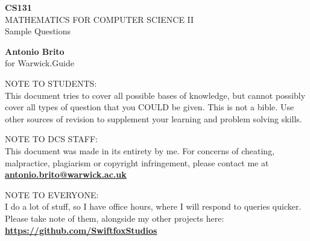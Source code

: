 \documentclass[12pt]{exam}
\begin{document}
\begin{titlepage}
   \begin{center}
       \vspace*{1cm}

       \Large \textbf{CS131}
       \\
        MATHEMATICS FOR COMPUTER SCIENCE II
        \\
        \small Sample Questions
            
       \vspace{1.5cm}

       \large \textbf{Antonio Brito}
       \\
       for Warwick.Guide

       \vfill
            
       NOTE TO STUDENTS:
       \\
       This document tries to cover all possible bases of knowledge, but cannot possibly cover all types of question that you COULD be given. This is not a bible. Use other sources of revision to supplement your learning and problem solving skills.
       
            
       \vspace{0.8cm}
       
       NOTE TO DCS STAFF:
       \\
       This document was made in its entirety by me. For concerns of cheating, malpractice, plagiarism or copyright infringement, please contact me at \href{mailto:antonio.brito@warwick.ac.uk}{\textbf{antonio.brito@warwick.ac.uk}} 
     
        \vspace{0.8cm}
        NOTE TO EVERYONE:
        \\
        I do a lot of stuff, so I have office hours, where I will respond to queries quicker. Please take note of them, alongside my other projects here: \href{https://github.com/SwiftfoxStudios}{\textbf{https://github.com/SwiftfoxStudios}}
            
   \end{center}
\end{titlepage}
\end{document}
